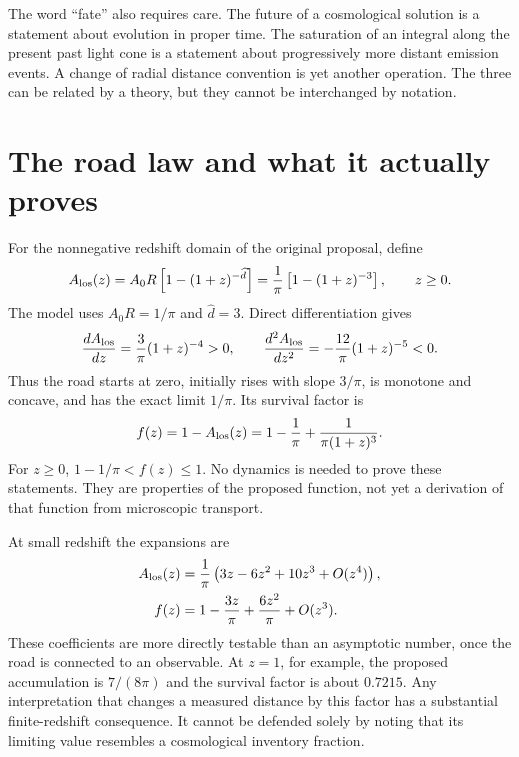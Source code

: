 The word ``fate'' also requires care. The future of a cosmological solution is a statement about evolution in proper time. The saturation of an integral along the present past light cone is a statement about progressively more distant emission events. A change of radial distance convention is yet another operation. The three can be related by a theory, but they cannot be interchanged by notation.

\section{The road law and what it actually proves}
For the nonnegative redshift domain of the original proposal, define
\begin{equation}
 A_{\rm los}(z)=A_0R\left[1-(1+z)^{-\widehat d}\right]
 =\frac1\pi\left[1-(1+z)^{-3}\right],\qquad z\geq0.
 \label{c12:road}
\end{equation}
The model uses $A_0R=1/\pi$ and $\widehat d=3$. Direct differentiation gives
\begin{equation}
 \frac{dA_{\rm los}}{dz}=\frac3\pi(1+z)^{-4}>0,
 \qquad
 \frac{d^2A_{\rm los}}{dz^2}=-\frac{12}\pi(1+z)^{-5}<0.
 \label{c12:roadderivatives}
\end{equation}
Thus the road starts at zero, initially rises with slope $3/\pi$, is monotone and concave, and has the exact limit $1/\pi$. Its survival factor is
\begin{equation}
 f(z)=1-A_{\rm los}(z)=1-\frac1\pi+\frac1{\pi(1+z)^3}.
 \label{c12:survival}
\end{equation}
For $z\geq0$, $1-1/\pi<f(z)\leq1$. No dynamics is needed to prove these statements. They are properties of the proposed function, not yet a derivation of that function from microscopic transport.

At small redshift the expansions are
\begin{align}
 A_{\rm los}(z)&=\frac1\pi\left(3z-6z^2+10z^3+O(z^4)\right),
 \label{c12:roadseries}\\
 f(z)&=1-\frac{3z}{\pi}+\frac{6z^2}{\pi}+O(z^3).
 \label{c12:fseries}
\end{align}
These coefficients are more directly testable than an asymptotic number, once the road is connected to an observable. At $z=1$, for example, the proposed accumulation is $7/(8\pi)$ and the survival factor is about $0.7215$. Any interpretation that changes a measured distance by this factor has a substantial finite-redshift consequence. It cannot be defended solely by noting that its limiting value resembles a cosmological inventory fraction.

